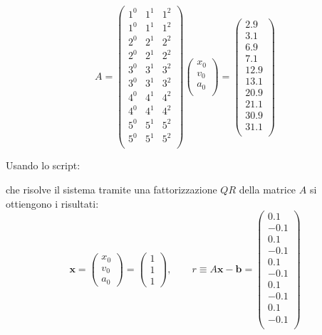 \[
	A = 
	\begin{pmatrix}
		1^0 & 1^1 & 1^2 \\
		1^0 & 1^1 & 1^2 \\
		2^0 & 2^1 & 2^2 \\
		2^0 & 2^1 & 2^2 \\
		3^0 & 3^1 & 3^2 \\
		3^0 & 3^1 & 3^2 \\
        	4^0 & 4^1 & 4^2 \\
		4^0 & 4^1 & 4^2 \\
        	5^0 & 5^1 & 5^2 \\
		5^0 & 5^1 & 5^2 \\
	\end{pmatrix}
	\begin{pmatrix}
		x_0 \\
		v_0 \\
		a_0 \\
	\end{pmatrix}
	=
	\begin{pmatrix}
		2.9 \\
		3.1 \\
		6.9 \\
		7.1 \\
		12.9 \\
		13.1 \\
		20.9 \\
		21.1 \\
		30.9 \\
		31.1 \\
	\end{pmatrix}
\]

Usando lo script:


che risolve il sistema tramite una fattorizzazione $QR$ della matrice $A$ si ottiengono i risultati:
\[
		\mathbf{x} = \begin{pmatrix} x_0 \\ v_0 \\ a_0 \end{pmatrix}  = \begin{pmatrix} 1 \\ 1 \\ 1 \end{pmatrix} 
		, \qquad
		r \equiv A\mathbf{x} - \mathbf{b} = \begin{pmatrix} 0.1 \\ -0.1 \\ 0.1 \\ -0.1 \\ 0.1 \\ -0.1 \\ 0.1 \\ -0.1 \\ 0.1 \\ -0.1 \\ \end{pmatrix} 
\]
